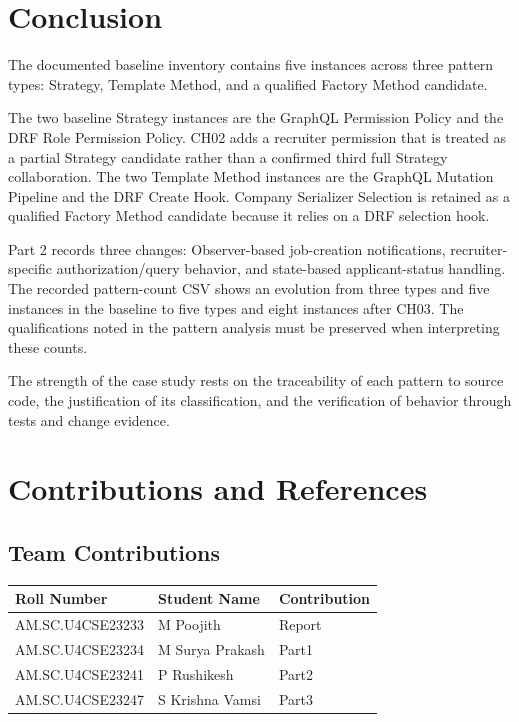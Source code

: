 \documentclass[11pt,a4paper]{article}
\begin{document}
\appendix

\section{Conclusion}

The documented baseline inventory contains five instances
across three pattern types: Strategy, Template Method, and
a qualified Factory Method candidate.

The two baseline Strategy instances are the GraphQL Permission Policy
and the DRF Role Permission Policy. CH02 adds a recruiter permission
that is treated as a partial Strategy candidate rather than a confirmed
third full Strategy collaboration. The two Template Method
instances are the GraphQL Mutation Pipeline and the DRF
Create Hook. Company Serializer Selection is retained as
a qualified Factory Method candidate because it relies on
a DRF selection hook.

Part 2 records three changes: Observer-based job-creation
notifications, recruiter-specific authorization/query
behavior, and state-based applicant-status handling. The
recorded pattern-count CSV shows an evolution from three
types and five instances in the baseline to five types and
eight instances after CH03. The qualifications noted in
the pattern analysis must be preserved when interpreting
these counts.

The strength of the case study rests on the traceability
of each pattern to source code, the justification of its
classification, and the verification of behavior through
tests and change evidence.

\section{Contributions and References}

\subsection{Team Contributions}

\begin{tabularx}{\linewidth}{@{}lXl@{}}
\toprule
Roll Number & Student Name & Contribution\\
\midrule
AM.SC.U4CSE23233 & M Poojith & Report\\
AM.SC.U4CSE23234 & M Surya Prakash & Part1\\
AM.SC.U4CSE23241 & P Rushikesh & Part2\\
AM.SC.U4CSE23247 & S Krishna Vamsi & Part3\\
\bottomrule
\end{tabularx}
\end{document}
